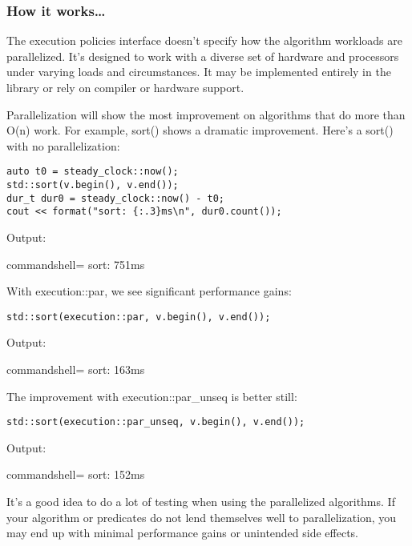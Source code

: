 \subsubsection{How it works…}

The execution policies interface doesn't specify how the algorithm workloads are parallelized. It's designed to work with a diverse set of hardware and processors under varying loads and circumstances. It may be implemented entirely in the library or rely on compiler or hardware support.

Parallelization will show the most improvement on algorithms that do more than O(n) work. For example, sort() shows a dramatic improvement. Here's a sort() with no parallelization:

\begin{lstlisting}[style=styleCXX]
auto t0 = steady_clock::now();
std::sort(v.begin(), v.end());
dur_t dur0 = steady_clock::now() - t0;
cout << format("sort: {:.3}ms\n", dur0.count());
\end{lstlisting}

Output:

\begin{tcblisting}{commandshell={}}
sort: 751ms
\end{tcblisting}

With execution::par, we see significant performance gains:

\begin{lstlisting}[style=styleCXX]
std::sort(execution::par, v.begin(), v.end());
\end{lstlisting}

Output:

\begin{tcblisting}{commandshell={}}
sort: 163ms
\end{tcblisting}

The improvement with execution::par\_unseq is better still:

\begin{lstlisting}[style=styleCXX]
std::sort(execution::par_unseq, v.begin(), v.end());
\end{lstlisting}

Output:

\begin{tcblisting}{commandshell={}}
sort: 152ms
\end{tcblisting}

It's a good idea to do a lot of testing when using the parallelized algorithms. If your algorithm or predicates do not lend themselves well to parallelization, you may end up with minimal performance gains or unintended side effects.


